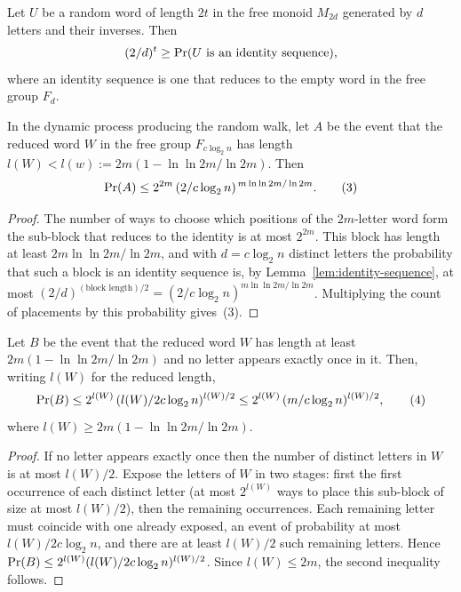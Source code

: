 \begin{lemma}
  \label{lem:identity-sequence}
  \notready
  Let $U$ be a random word of length $2t$ in the free monoid $M_{2d}$ generated
  by $d$ letters and their inverses. Then
  \[
    (2/d)^{t} \ge \operatorname{Pr}(U \text{ is an identity sequence}),
  \]
  where an identity sequence is one that reduces to the empty word in the free
  group $F_d$.
\end{lemma}

\begin{lemma}
  \label{lem:prA-bound}
  In the dynamic process producing the random walk, let $A$ be the event that
  the reduced word $W$ in the free group $F_{c\log_2 n}$ has length
  $l(W) < l(w) := 2m(1 - \ln\ln 2m / \ln 2m)$. Then
  \[
    \operatorname{Pr}(A) \le 2^{2m}\,(2/c\log_2 n)^{\,m\ln\ln 2m / \ln 2m}. \tag{3}
  \]
\end{lemma}
\begin{proof}
  The number of ways to choose which positions of the $2m$-letter word form the
  sub-block that reduces to the identity is at most $2^{2m}$. This block has
  length at least $2m\ln\ln 2m / \ln 2m$, and with $d = c\log_2 n$ distinct
  letters the probability that such a block is an identity sequence is, by
  Lemma~\ref{lem:identity-sequence}, at most $(2/d)^{(\text{block length})/2}
  = (2/c\log_2 n)^{m\ln\ln 2m / \ln 2m}$. Multiplying the count of placements by
  this probability gives~(3).
\end{proof}

\begin{lemma}
  \label{lem:prB-bound}
  Let $B$ be the event that the reduced word $W$ has length at least
  $2m(1 - \ln\ln 2m / \ln 2m)$ and no letter appears exactly once in it. Then,
  writing $l(W)$ for the reduced length,
  \[
    \operatorname{Pr}(B) \le 2^{l(W)}\,(l(W)/2c\log_2 n)^{l(W)/2}
            \le 2^{l(W)}\,(m/c\log_2 n)^{l(W)/2}, \tag{4}
  \]
  where $l(W) \ge 2m(1 - \ln\ln 2m / \ln 2m)$.
\end{lemma}
\begin{proof}
  If no letter appears exactly once then the number of distinct letters in $W$
  is at most $l(W)/2$. Expose the letters of $W$ in two stages: first the
  first occurrence of each distinct letter (at most $2^{l(W)}$ ways to place
  this sub-block of size at most $l(W)/2$), then the remaining occurrences. Each
  remaining letter must coincide with one already exposed, an event of
  probability at most $l(W)/2c\log_2 n$, and there are at least $l(W)/2$ such
  remaining letters. Hence $\operatorname{Pr}(B) \le 2^{l(W)}(l(W)/2c\log_2 n)^{l(W)/2}$.
  Since $l(W) \le 2m$, the second inequality follows.
\end{proof}

